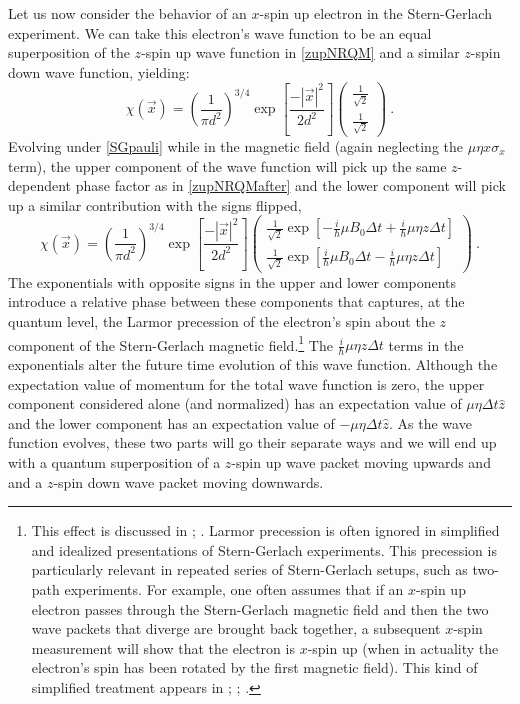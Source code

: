 \documentclass[12pt,secnumarabic,amsmath,amssymb,balancelastpage,nofootinbib]{article}
\begin{document}
Let us now consider the behavior of an $x$-spin up electron in the Stern-Gerlach experiment.  We can take this electron's wave function to be an equal superposition of the $z$-spin up wave function in \eqref{zupNRQM} and a similar $z$-spin down wave function, yielding:
\begin{equation}
\chi(\vec{x}) = \left(\frac{1}{\pi d^2}\right)^{3/4}  \exp\left[\frac{-|\vec{x}|^2}{2 d^2}\right] \left(\begin{matrix} \frac{1}{\sqrt{2}}\\ \frac{1}{\sqrt{2}} \end{matrix}\right)
\ .
\label{xupNRQM}
\end{equation}
Evolving under \eqref{SGpauli} while in the magnetic field (again neglecting the $\mu \eta x \sigma_x$ term), the upper component of the wave function will pick up the same $z$-dependent phase factor as in \eqref{zupNRQMafter} and the lower component will pick up a similar contribution with the signs flipped,
\begin{equation}
\chi(\vec{x}) = \left(\frac{1}{\pi d^2}\right)^{3/4} \exp\left[\frac{-|\vec{x}|^2}{2 d^2} \right] \left(\begin{matrix} \frac{1}{\sqrt{2}}\exp\left[-\frac{i}{\hbar}\mu B_0 \Delta t + \frac{i}{\hbar}\mu \eta z \Delta t\right] \\ \frac{1}{\sqrt{2}}\exp\left[\frac{i}{\hbar}\mu B_0 \Delta t - \frac{i}{\hbar}\mu \eta z \Delta t\right] \end{matrix}\right)
\ .
\label{xupNRQMafter}
\end{equation}
The exponentials with opposite signs in the upper and lower components introduce a relative phase between these components that captures, at the quantum level, the Larmor precession of the electron's spin about the $z$ component of the Stern-Gerlach magnetic field.\footnote{This effect is discussed in \citet[example 4.3]{griffithsQM}; \citet[sec.\ 12.1]{ballentine}.  Larmor precession is often ignored in simplified and idealized presentations of Stern-Gerlach experiments.  This precession is particularly relevant in repeated series of Stern-Gerlach setups, such as two-path experiments.  For example, one often assumes that if an $x$-spin up electron passes through the Stern-Gerlach magnetic field and then the two wave packets that diverge are brought back together, a subsequent $x$-spin measurement will show that the electron is $x$-spin up (when in actuality the electron's spin has been rotated by the first magnetic field).  This kind of simplified treatment appears in \citet[pg.\ 7--11]{albertQM}; \citet[pg.\ 22--25]{maudlinQM}; \citet[ch.\ 2]{barrettQM}.}  The $\frac{i}{\hbar}\mu \eta z \Delta t$ terms in the exponentials alter the future time evolution of this wave function.  Although the expectation value of momentum for the total wave function is zero, the upper component considered alone (and normalized) has an expectation value of $\mu \eta \Delta t \hat{z}$ and the lower component has an expectation value of $-\mu \eta \Delta t \hat{z}$.  As the wave function evolves, these two parts will go their separate ways and we will end up with a quantum superposition of a $z$-spin up wave packet moving upwards and and a $z$-spin down wave packet moving downwards.
\end{document}
